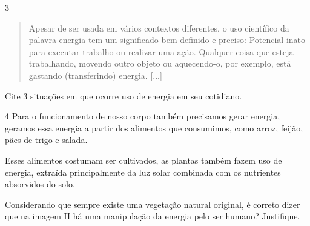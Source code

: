 
\num{3}

\begin{quote}
Apesar de ser usada em vários contextos diferentes, o uso
científico da palavra energia tem um significado bem definido e preciso:
Potencial inato para executar trabalho ou realizar uma ação. Qualquer
coisa que esteja trabalhando, movendo outro objeto ou aquecendo-o, por
exemplo, está gastando (transferindo) energia. {[}...{]}

\end{quote}

Cite 3 situações em que ocorre uso de energia em seu cotidiano.



\num{4} Para o funcionamento de nosso corpo também precisamos gerar energia,
geramos essa energia a partir dos alimentos que consumimos, como arroz,
feijão, pães de trigo e salada.

Esses alimentos costumam ser cultivados, as plantas também fazem uso de
energia, extraída principalmente da luz solar combinada com os
nutrientes absorvidos do solo.

%
%
%
%
%

Considerando que sempre existe uma vegetação natural original, é correto
dizer que na imagem II há uma manipulação da energia pelo ser humano?
Justifique.



